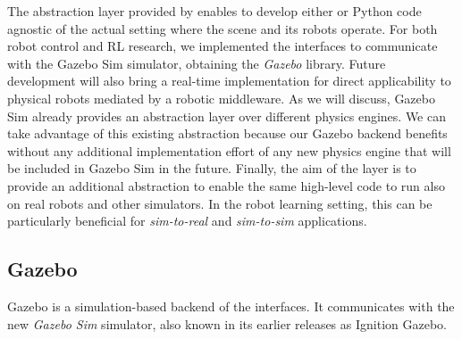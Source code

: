 The abstraction layer provided by \scenario enables to develop either \cpp or Python code agnostic of the actual setting where the scene and its robots operate.
For both robot control and \ac{RL} research, we implemented the \scenario interfaces to communicate with the Gazebo Sim simulator, obtaining the \emph{\scenario Gazebo} library.
Future development will also bring a real-time implementation for direct applicability to physical robots mediated by a robotic middleware.
As we will discuss, Gazebo Sim already provides an abstraction layer over different physics engines.
We can take advantage of this existing abstraction because our \scenario Gazebo backend benefits without any additional implementation effort of any new physics engine that will be included in Gazebo Sim in the future.
Finally, the aim of the \scenario layer is to provide an additional abstraction to enable the same high-level code to run also on real robots and other simulators.
In the robot learning setting, this can be particularly beneficial for \emph{sim-to-real} and \emph{sim-to-sim} applications.

\subsection{\scenario Gazebo}
\label{sec:scenario_gazebo}

\scenario Gazebo is a simulation-based backend of the \scenario interfaces.
It communicates with the new \emph{Gazebo Sim} simulator, also known in its earlier releases as Ignition Gazebo.

